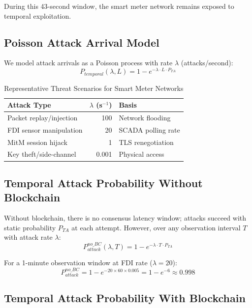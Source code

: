 \documentclass[10pt,twocolumn,letterpaper]{article}
\begin{document}
During this 43-second window, the smart meter network remains exposed to temporal exploitation.

\subsection{Poisson Attack Arrival Model}

We model attack arrivals as a Poisson process with rate $\lambda$ (attacks/second):
\begin{equation}
\boxed{P_{temporal}(\lambda, L) = 1 - e^{-\lambda \cdot L \cdot P_{TA}}}
\label{eq:poisson}
\end{equation}

\begin{table}[htbp]
\caption{Representative Threat Scenarios for Smart Meter Networks}
\label{tab:attack_rates}
\centering
\scriptsize
\begin{tabular}{@{}lrl@{}}
\toprule
\textbf{Attack Type} & \textbf{$\lambda$ (s$^{-1}$)} & \textbf{Basis} \\
\midrule
Packet replay/injection & 100 & Network flooding \\
FDI sensor manipulation & 20  & SCADA polling rate \\
MitM session hijack     & 1   & TLS renegotiation \\
Key theft/side-channel  & 0.001 & Physical access \\
\bottomrule
\end{tabular}
\end{table}

\subsection{Temporal Attack Probability Without Blockchain}

Without blockchain, there is no consensus latency window; attacks succeed with static probability $P_{TA}$ at each attempt. However, over any observation interval $T$ with attack rate $\lambda$:
\begin{equation}
P_{attack}^{no\_BC}(\lambda, T) = 1 - e^{-\lambda \cdot T \cdot P_{TA}}
\end{equation}

For a 1-minute observation window at FDI rate ($\lambda = 20$):
\begin{equation}
P_{attack}^{no\_BC} = 1 - e^{-20 \times 60 \times 0.005} = 1 - e^{-6} \approx 0.998
\end{equation}

\subsection{Temporal Attack Probability With Blockchain}
\end{document}

